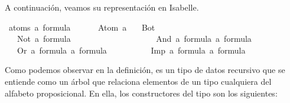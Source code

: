 \begin{isabellebody}
\begin{isamarkuptext}
  A continuación, veamos su representación en Isabelle.%
\end{isamarkuptext}\isamarkuptrue%
\isamarkupfalse%
\ {\isacharparenleft}atoms{\isacharcolon}\ {\isacharprime}a{\isacharparenright}\ formula\ {\isacharequal}\ \isanewline
\ \ \ \ Atom\ {\isacharprime}a\isanewline
\ \ {\isacharbar}\ Bot\ \ \ \ \ \ \ \ \ \ \ \ \ \ \ \ \ \ \ \ \ \ \ \ \ \ \ \ \ \ {\isacharparenleft}{\isachardoublequoteopen}{\isasymbottom}{\isachardoublequoteclose}{\isacharparenright}\ \ \isanewline
\ \ {\isacharbar}\ Not\ {\isachardoublequoteopen}{\isacharprime}a\ formula{\isachardoublequoteclose}\ \ \ \ \ \ \ \ \ \ \ \ \ \ \ \ \ {\isacharparenleft}{\isachardoublequoteopen}\isactrlbold {\isasymnot}{\isachardoublequoteclose}{\isacharparenright}\isanewline
\ \ {\isacharbar}\ And\ {\isachardoublequoteopen}{\isacharprime}a\ formula{\isachardoublequoteclose}\ {\isachardoublequoteopen}{\isacharprime}a\ formula{\isachardoublequoteclose}\ \ \ \ {\isacharparenleft}\ {\isachardoublequoteopen}\isactrlbold {\isasymand}{\isachardoublequoteclose}\ {}{}{\isacharparenright}\isanewline
\ \ {\isacharbar}\ Or\ {\isachardoublequoteopen}{\isacharprime}a\ formula{\isachardoublequoteclose}\ {\isachardoublequoteopen}{\isacharprime}a\ formula{\isachardoublequoteclose}\ \ \ \ \ {\isacharparenleft}\ {\isachardoublequoteopen}\isactrlbold {\isasymor}{\isachardoublequoteclose}\ {}{}{\isacharparenright}\isanewline
\ \ {\isacharbar}\ Imp\ {\isachardoublequoteopen}{\isacharprime}a\ formula{\isachardoublequoteclose}\ {\isachardoublequoteopen}{\isacharprime}a\ formula{\isachardoublequoteclose}\ \ \ \ {\isacharparenleft}\ {\isachardoublequoteopen}\isactrlbold {\isasymrightarrow}{\isachardoublequoteclose}\ {}{}{\isacharparenright}%
\begin{isamarkuptext}%
Como podemos observar en la definición,  es un tipo de datos recursivo que se 
  entiende como un árbol que relaciona elementos de un tipo  cualquiera del alfabeto 
  proposicional. En ella, los constructores del tipo son los siguientes:


\end{isamarkuptext}
\end{isabellebody}
